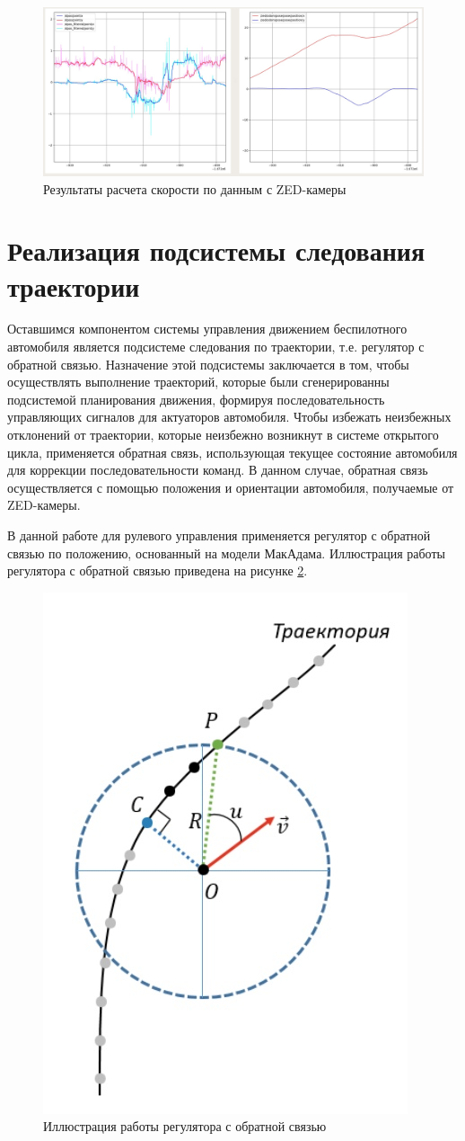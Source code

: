 \begin{figure}[h]
    \centering
    \includegraphics[width=\linewidth]{images/3_devel/zed_calc_speed}
    \caption{Результаты расчета скорости по данным с ZED-камеры}
    \label{img:zed_calc_speed}
\end{figure}

\section{Реализация подсистемы следования траектории}

Оставшимся компонентом системы управления движением беспилотного автомобиля является подсистеме следования по траектории,
т.е. регулятор с обратной связью. Назначение этой подсистемы заключается в том, чтобы осуществлять выполнение траекторий,
которые были сгенерированны подсистемой планирования движения, формируя последовательность управляющих сигналов для
актуаторов автомобиля. Чтобы избежать неизбежных отклонений от траектории, которые неизбежно возникнут в системе
открытого цикла, применяется обратная связь, использующая текущее состояние автомобиля для коррекции последовательности
команд. В данном случае, обратная связь осуществляется с помощью положения и ориентации автомобиля, получаемые от
ZED-камеры.

В данной работе для рулевого управления применяется регулятор с обратной связью
по положению, основанный на модели МакАдама. Иллюстрация работы регулятора с обратной
связью приведена на рисунке \ref{img:path_moving}.

\begin{figure}[h]
    \centering
    \includegraphics[width=0.4\linewidth]{images/path_moving}
    \caption{Иллюстрация работы регулятора с обратной связью}
    \label{img:path_moving}
\end{figure}

